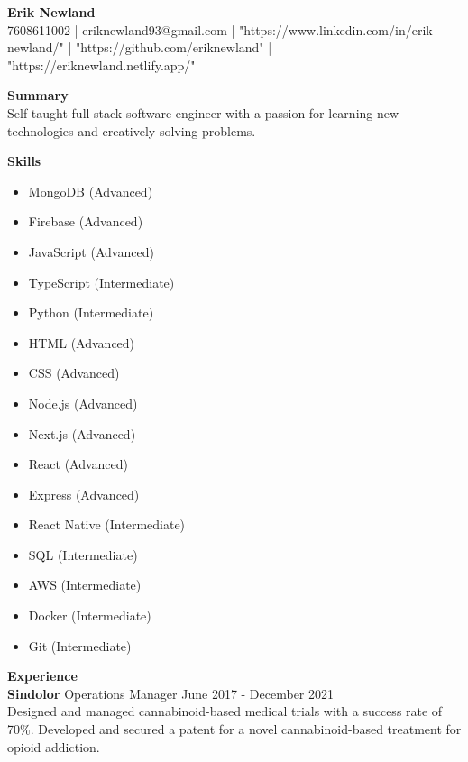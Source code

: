 \documentclass[10pt,a4paper]{article}
\begin{document}
\begin{center}
    \textbf{\Large Erik Newland} \\
    \vspace{0.2cm}
    7608611002 \hspace{0.2cm} | \hspace{0.2cm} eriknewland93@gmail.com \hspace{0.2cm} | \hspace{0.2cm} "https://www.linkedin.com/in/erik-newland/" \hspace{0.2cm} | \hspace{0.2cm} "https://github.com/eriknewland" \hspace{0.2cm} | \hspace{0.2cm} "https://eriknewland.netlify.app/"
\end{center}

\textbf{\large Summary} \\
Self-taught full-stack software engineer with a passion for learning new technologies and creatively solving problems.

\textbf{\large Skills} \\
\begin{itemize}[noitemsep,topsep=0pt]
    \item MongoDB (Advanced)
    \item Firebase (Advanced)
    \item JavaScript (Advanced)
    \item TypeScript (Intermediate)
    \item Python (Intermediate)
    \item HTML (Advanced)
    \item CSS (Advanced)
    \item Node.js (Advanced)
    \item Next.js (Advanced)
    \item React (Advanced)
    \item Express (Advanced)
    \item React Native (Intermediate)
    \item SQL (Intermediate)
    \item AWS (Intermediate)
    \item Docker (Intermediate)
    \item Git (Intermediate)
\end{itemize}

\textbf{\large Experience} \\
\textbf{Sindolor} \hfill Operations Manager \hfill June 2017 - December 2021 \\
Designed and managed cannabinoid-based medical trials with a success rate of 70\%. Developed and secured a patent for a novel cannabinoid-based treatment for opioid addiction.
\end{document}
